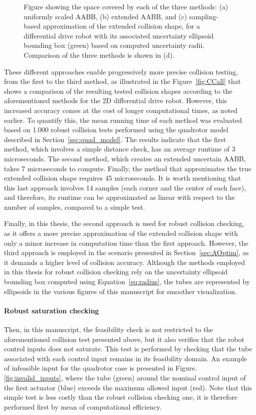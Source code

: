 \begin{figure}[t]
    \caption{Figure showing the space covered by each of the three methods: (a) uniformly scaled AABB, (b) extended AABB, and (c) sampling-based approximation of the extended collision shape, for a differential drive robot with its associated uncertainty ellipsoid bounding box (green) based on computed uncertainty radii. Comparison of the three methods is shown in (d).}
    \label{fig:CCmethods}
\end{figure}

These different approaches enable progressively more precise collision testing, from the first to the third method, as illustrated in the Figure~\ref{fig:CCall} that shows a comparison of the resulting tested collision shapes according to the aforementioned methods for the 2D differential drive robot.
However, this increased accuracy comes at the cost of longer computational times, as noted earlier. 
To quantify this, the mean running time of each method was evaluated based on 1.000 robust collision tests performed using the quadrotor model described in Section~\ref{sec:quad_model}. 
The results indicate that the first method, which involves a simple distance check, has an average runtime of 3 microseconds. 
The second method, which creates an extended uncertain AABB, takes 7 microseconds to compute. 
Finally, the method that approximates the true extended collision shape requires 45 microseconds. 
It is worth mentioning that this last approach involves 14 samples (each corner and the center of each face), and therefore, its runtime can be approximated as linear with respect to the number of samples, compared to a simple test.

Finally, in this thesis, the second approach is used for robust collision checking, as it offers a more precise approximation of the extended collision shape with only a minor increase in computation time than the first approach. 
However, the third approach is employed in the scenario presented in Section~\ref{sec:AOptim}, as it demands a higher level of collision accuracy.
Although the methods employed in this thesis for robust collision checking rely on the uncertainty ellipsoid bounding box computed using Equation~\ref{eq:radius}, the tubes are represented by ellipsoids in the various figures of this manuscript for smoother visualization.

\paragraph{Robust saturation checking}
Then, in this manuscript, the feasibility check is not restricted to the aforementioned collision test presented above, but it also verifies that the robot control inputs does not saturate.
This test is performed by checking that the tube associated with each control input remains in its feasibility domain.
An example of infeasible input for the quadrotor case is presented in Figure.\ref{fig:invalid_inputs},  where the tube (green) around the nominal control input of the first actuator (blue) exceeds the maximum allowed input (red).
Note that this simple test is less costly than the robust collision checking one, it is therefore performed first by mean of computational efficiency. 

